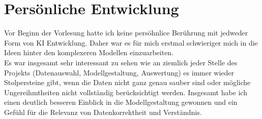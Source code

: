 \documentclass[runningheads]{llncs}
\begin{document}
\section{Persönliche Entwicklung}
Vor Beginn der Vorlesung hatte ich keine persöhnlice Berührung mit jedweder Form von KI Entwicklung. Daher war es für mich erstmal schwieriger mich in die Ideen hinter den komplexeren Modellen einzuarbeiten. 
\\
Es war insgesamt sehr interessant zu sehen wie an ziemlich jeder Stelle des Projekts (Datenauswahl, Modellgestaltung, Auswertung) es immer wieder Stolpersteine gibt, wenn die Daten nicht ganz genau sauber sind oder mögliche Ungereihmtheiten nicht vollständig berücksichtigt werden. Insgesamt habe ich einen deutlich besseren Einblick in die Modellgestaltung gewonnen und ein Gefühl für die Relevanz von Datenkorrektheit und Verständnis.
\end{document}
